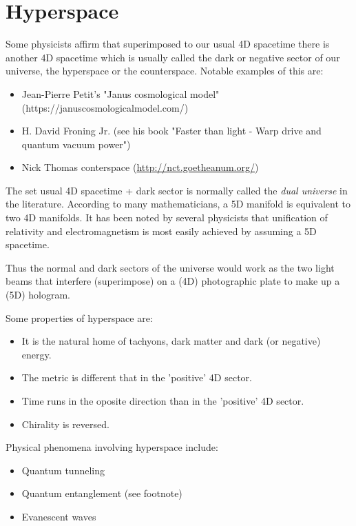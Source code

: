 \chapter{Hyperspace}

Some physicists affirm that superimposed to our usual 4D spacetime there is another 4D spacetime which is usually called the dark or negative sector of our universe, the hyperspace or the counterspace. Notable examples of this are:

\begin{itemize}
	\item Jean-Pierre Petit's "Janus cosmological model" (https://januscosmologicalmodel.com/)
	\item H. David Froning Jr. (see his book "Faster than light - Warp drive and quantum vacuum power")
	\item Nick Thomas conterspace (\href{http://nct.goetheanum.org/}{http://nct.goetheanum.org/})
	
\end{itemize}

The set usual 4D spacetime + dark sector is normally called the \emph{dual universe} in the literature. According to many mathematicians, a 5D manifold is equivalent to two 4D manifolds. It has been noted by several physicists that unification of relativity and electromagnetism is most easily achieved by assuming a 5D spacetime.

Thus the normal and dark sectors of the universe would work as the two light beams that interfere (superimpose) on a (4D) photographic plate to make up a (5D) hologram.

Some properties of hyperspace are:

\begin{itemize}
 \item It is the natural home of tachyons, dark matter and dark (or negative) energy.
 \item The metric is different that in the 'positive' 4D sector.
 \item Time runs in the oposite direction than in the 'positive' 4D sector.
 \item Chirality is reversed.
\end{itemize}

Physical phenomena involving hyperspace include:

\begin{itemize}
	\item Quantum tunneling
	\item Quantum entanglement (see footnote)
	\item Evanescent waves
\end{itemize}

